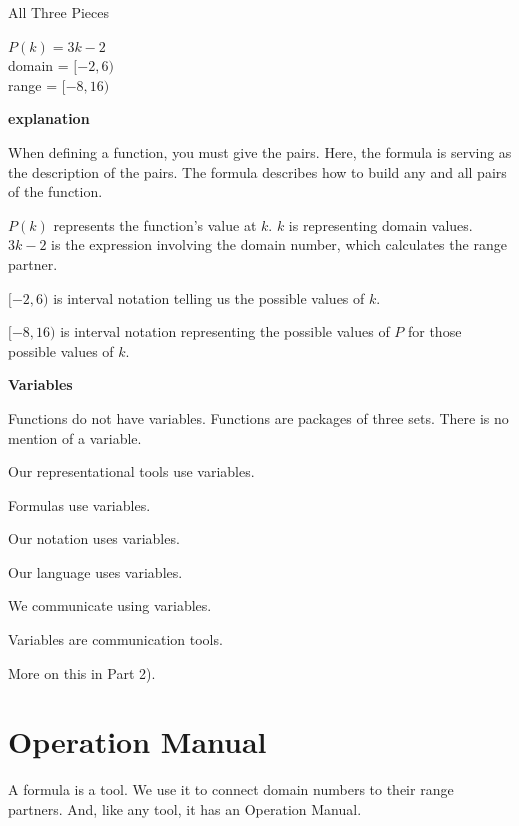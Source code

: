 \documentclass{ximera}
\begin{document}
\begin{example}   All Three Pieces 

$P(k) = 3k - 2$ \\
domain = $[-2, 6)$ \\
range = $[-8, 16)$


\textbf{\textcolor{red!75!green}{explanation}} 


When defining a function, you must give the pairs.  Here, the formula is serving as the description of the pairs. The formula describes how to build any and all pairs of the function.

$P(k)$ represents the function's value at $k$.  $k$ is representing domain values. $3k - 2$ is the expression involving the domain number, which calculates the range partner. 

$[-2, 6)$ is interval notation telling us the possible values of $k$. 

$[-8, 16)$ is interval notation representing the possible values of $P$ for those possible values of $k$.  



\end{example}




\begin{warning} \textbf{\textcolor{red!70!darkgray}{Variables}}    

Functions do not have variables.  Functions are packages of three sets.  There is no mention of a variable. 

Our representational tools use variables. 

Formulas use variables. 

Our notation uses variables. 

Our language uses variables. 

We communicate using variables.  

Variables are communication tools. 

\end{warning}

More on this in Part 2). 




\section*{Operation Manual}

A formula is a tool.  We use it to connect domain numbers to their range partners.  And, like any tool, it has an Operation Manual.
\end{document}
